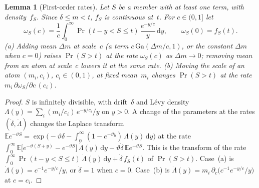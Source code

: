 \documentclass[11pt,a4paper]{article}
\theoremstyle{plain}
\newtheorem{lemma}[theorem]{Lemma}
\theoremstyle{definition}
\theoremstyle{remark}
\begin{document}
\begin{lemma}[First-order rates]\label{lem:gamma_rates}
Let $S$ be a member with at least one term, with density~$f_S$.
Since $\delta \le m < t$, $f_S$ is continuous at~$t$.
For $c \in (0, 1]$ let
\[
  \omega_S(c) = \frac{1}{c}\int_0^\infty \Pr(t - y < S \le t)\,\frac{e^{-y/c}}{y}\, \mathrm{d}y,
  \qquad \omega_S(0) = f_S(t).
\]
(a) Adding mean $\Delta m$ at scale~$c$ (a term $c\,\mathrm{Ga}(\Delta m/c, 1)$, or the constant $\Delta m$ when $c = 0$) raises $\Pr(S > t)$ at the rate $\omega_S(c)$ as $\Delta m \to 0$; removing mean from an atom at scale~$c$ lowers it at the same rate.
(b) Moving the scale of an atom $(m_i, c_i)$, $c_i \in (0,1)$, at fixed mean~$m_i$ changes $\Pr(S > t)$ at the rate $m_i\, \partial\omega_S/\partial c\,(c_i)$.
\end{lemma}
\begin{proof}
$S$ is infinitely divisible, with drift~$\delta$ and L\'evy density $\Lambda(y) = \sum_i (m_i/c_i)\, e^{-y/c_i}/y$ on $y > 0$.
A change of the parameters at the rates $(\dot\delta, \dot\Lambda)$ changes the Laplace transform $\mathbb{E}e^{-\vartheta S} = \exp\bigl(-\vartheta\delta - \int_0^\infty (1 - e^{-\vartheta y})\,\Lambda(y)\, \mathrm{d}y\bigr)$ at the rate $\int_0^\infty \mathbb{E}\bigl[e^{-\vartheta(S+y)} - e^{-\vartheta S}\bigr]\,\dot\Lambda(y)\, \mathrm{d}y - \vartheta\dot\delta\,\mathbb{E}e^{-\vartheta S}$.
This is the transform of the rate $\int_0^\infty \Pr(t - y < S \le t)\,\dot\Lambda(y)\, \mathrm{d}y + \dot\delta\, f_S(t)$ of $\Pr(S > t)$.
Case~(a) is $\dot\Lambda(y) = c^{-1}e^{-y/c}/y$, or $\dot\delta = 1$ when $c = 0$.
Case~(b) is $\dot\Lambda(y) = m_i\,\partial_c\bigl(c^{-1}e^{-y/c}/y\bigr)$ at $c = c_i$.
\end{proof}
\end{document}
